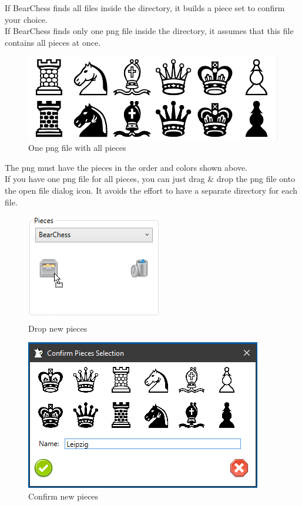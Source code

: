 \documentclass[11pt,a4paper]{article}
\begin{document}
If BearChess finds all files inside the directory, it builds a piece set to confirm your choice.\\

If BearChess finds only one png file inside the directory, it assumes that this file contains all pieces at once.

\begin{figure}[H]
	\centering
	\includegraphics[scale=6.5]{Leipzig.png}
	\caption{One png file with all pieces}
	\label{fig:Leipzig}
\end{figure}

The png must have the pieces in the order and colors shown above.\\
If you have one png file for all pieces, you can just drag \& drop the png file onto the
open file dialog icon. It avoids the effort to have a separate directory for each file.
\begin{figure}[H]
	\centering
	\includegraphics[scale=0.9]{DropPieceSet.png}
	\caption{Drop new pieces }
	\label{fig:DropPieceSet}
\end{figure}

\begin{figure}[H]
	\centering
	\includegraphics[scale=0.9]{ConfirmPieces.png}
	\caption{Confirm new pieces }
	\label{fig:ConfirmPieces}
\end{figure}
\end{document}

